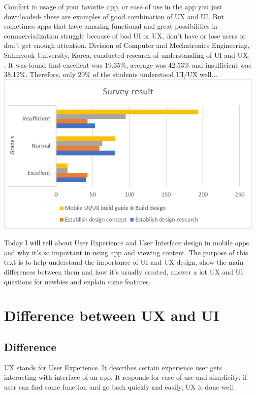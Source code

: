 \documentclass[10pt,twoside,english,a4paper]{article}
\begin{document}
Comfort in usage of your favorite app, or ease of use in the app you just downloaded- these are examples of good combination of UX and UI. But sometimes apps that have amazing functional and great possibilities in commercialization struggle because of bad UI or UX, don’t have or lose users or don't get enough attention.
Division of Computer and Mechatronics Engineering, Sahmyook University, Korea, conducted research of understanding of UI and UX. . It was found that excellent was 19.35\%, average was 42.53\% and insufficient was 38.12\%. Therefore, only 20\% of the students understood UI/UX well...\cite{UnderstandingUI}
\includegraphics[width=1\textwidth]{diagram.png}

 Today I will tell about User Experience and User Interface design in mobile apps and why it’s so important in using app and viewing content\cite{Examples}. 
 The purpose of this text is to help understand the importance of UI and UX design, show the main differences between them and how it’s usually created, answer a lot UX and UI questions for newbies and explain some features.


\section{Difference between UX and UI} \label{UX/UI}
\subsection{Difference}

UX stands for User Experience. It describes certain experience user gets interacting with interface of an app. It responds for ease of use and simplicity: if user can find some function and go back quickly and easily, UX is done well.
\end{document}
